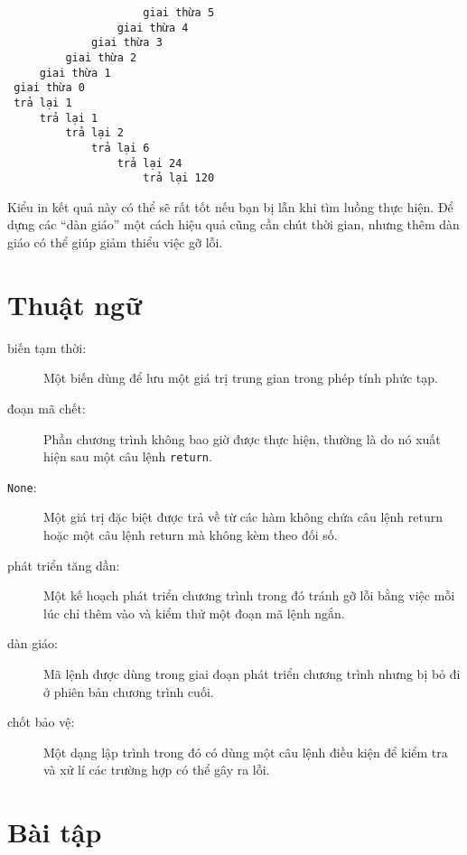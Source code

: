 \documentclass[11pt]{book}
\begin{document}
\beforeverb
\begin{verbatim}
                     giai thừa 5
                 giai thừa 4
             giai thừa 3
         giai thừa 2
     giai thừa 1
 giai thừa 0
 trả lại 1
     trả lại 1
         trả lại 2
             trả lại 6
                 trả lại 24
                     trả lại 120
\end{verbatim}
\afterverb
%
Kiểu in kết quả này có thể sẽ rất tốt nếu bạn bị lẫn khi tìm luồng 
thực hiện. Để dựng các ``dàn giáo'' một cách hiệu quả cũng cần chút
thời gian, nhưng thêm dàn giáo có thể giúp giảm thiểu việc gỡ lỗi.

\section{Thuật ngữ}

\begin{description}

\item[biến tạm thời:]  Một biến dùng để lưu một giá trị trung gian 
trong phép tính phức tạp.

\item[đoạn mã chết:]  Phần chương trình không bao giờ được thực hiện,
thường là do nó xuất hiện sau một câu lệnh {\tt return}.

\item[{\tt None}:]  Một giá trị đặc biệt được trả về từ các hàm không 
chứa câu lệnh return hoặc một câu lệnh return mà không kèm theo 
đối số.

\item[phát triển tăng dần:]  Một kế hoạch phát triển chương trình
trong đó tránh gỡ lỗi bằng việc mỗi lúc chỉ thêm vào và kiểm thử một
đoạn mã lệnh ngắn.

\item[dàn giáo:]  Mã lệnh được dùng trong giai đoạn phát triển chương
trình nhưng bị bỏ đi ở phiên bản chương trình cuối.

\item[chốt bảo vệ:]  Một dạng lập trình trong đó có dùng một câu lệnh
điều kiện để kiểm tra và xử lí các trường hợp có thể gây ra lỗi.

\end{description}


\section{Bài tập}
\end{document}

